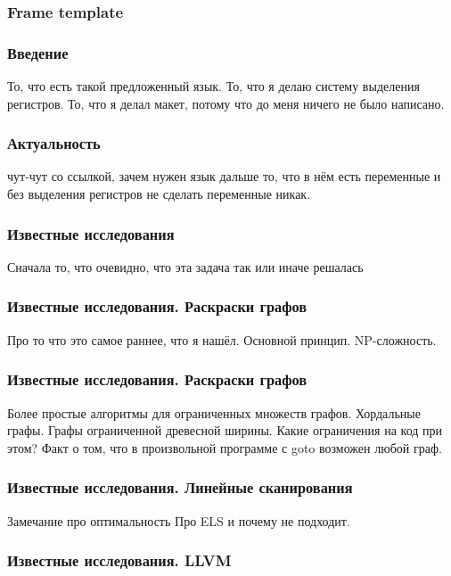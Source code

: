 \documentclass[10pt,a4paper]{beamer}
\date{}
\begin{document}
\maketitle

\begin{frame}
\frametitle{Frame template}

\end{frame}

\begin{frame}
\frametitle{Введение}

То, что есть такой предложенный язык.
То, что я делаю систему выделения регистров.
То, что я делал макет, потому что до меня ничего не было написано.

\end{frame}

\begin{frame}
\frametitle{Актуальность}
чут-чут со ссылкой, зачем нужен язык
дальше то, что в нём есть переменные и без выделения регистров не сделать переменные никак.

\end{frame}

\begin{frame}
\frametitle{Известные исследования}
Сначала то, что очевидно, что эта задача так или иначе решалась
\end{frame}

\begin{frame}
\frametitle{Известные исследования. Раскраски графов}
Про то что это самое раннее, что я нашёл.
Основной принцип.
NP-сложность.
\end{frame}

\begin{frame}
\frametitle{Известные исследования. Раскраски графов}
Более простые алгоритмы для ограниченных множеств графов.
Хордальные графы.
Графы ограниченной древесной ширины.
Какие ограничения на код при этом?
Факт о том, что в произвольной программе с goto возможен любой граф.
\end{frame}

\begin{frame}
\frametitle{Известные исследования. Линейные сканирования}
Замечание про оптимальность
Про ELS и почему не подходит.
\end{frame}

\begin{frame}
\frametitle{Известные исследования. LLVM}

\end{frame}
\end{document}
